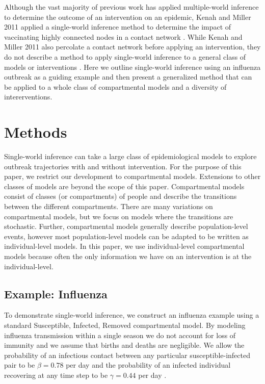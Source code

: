 \documentclass[PTRSB]{rsos}
\begin{document}
\begin{multicols}{2}
Although the vast majority of previous work has applied multiple-world inference to determine the outcome of an intervention on an epidemic, Kenah and Miller 2011 applied a single-world inference method to determine the impact of vaccinating highly connected nodes in a contact network \cite{kenah-miller:2011}.
While Kenah and Miller 2011 also percolate a contact network before applying an intervention, they do not describe a method to apply single-world inference to a general class of models or interventions \cite{kenah-miller:2011}.
Here we outline single-world inference using an influenza outbreak as a guiding example and then present a generalized method that can be applied to a whole class of compartmental models and a diversity of intererventions.

\section{Methods}
Single-world inference can take a large class of epidemiological models to explore outbreak trajectories with and without intervention. 
For the purpose of this paper, we restrict our development to compartmental models.
Extensions to other classes of models are beyond the scope of this paper.
Compartmental models consist of classes (or compartments) of people and describe the transitions between the different compartments.
There are many variations on compartmental models, but we focus on models where the transitions are stochastic.
Further, compartmental models generally describe population-level events, however most population-level models can be adapted to be written as individual-level models.
In this paper, we use individual-level compartmental models because often the only information we have on an intervention is at the individual-level.

\subsection{Example: Influenza}
To demonstrate single-world inference, we construct an influenza example using a standard Susceptible, Infected, Removed compartmental model.
By modeling influenza transmission within a single season we do not account for loss of immunity and we assume that births and deaths are negligible.
We allow the probability of an infectious contact between any particular susceptible-infected pair to be $\beta = 0.78$ per day and the probability of an infected individual recovering at any time step to be $\gamma = 0.44$ per day \cite{forsberg-white-et-al:2009}.


\end{multicols}
\end{document}
